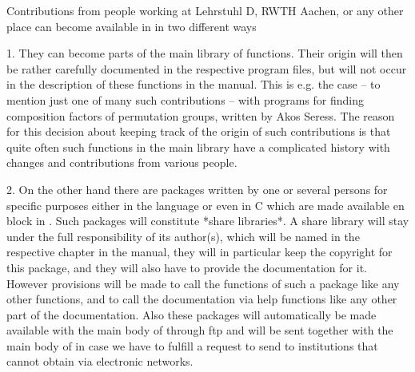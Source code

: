 \def\fuer{f{\accent127 u}r}
\def\GRAPE{\sf GRAPE}
\def\MeatAxe{\sf MeatAxe}
\def\SISYPHOS{\sc SISYPHOS}
\def\VE{Vector Enumeration}
\def\nauty{\it nauty}

Contributions from  people working at Lehrstuhl D,  RWTH  Aachen, or  any
other place can become available in {\GAP} in two different ways\:

1.  They can become parts of the main {\GAP} library of functions.  Their
origin will then be rather carefully documented in the respective program
files, but  will  not occur in the  description of these functions in the
manual.   This is  e.g.   the  case  -- to mention just one of many  such
contributions  --  with  programs  for  finding  composition  factors  of
permutation groups, written by Akos Seress. The reason for  this decision
about  keeping track  of the  origin of such  contributions is that quite
often such  functions  in  the  main  {\GAP} library  have a  complicated
history with changes and contributions from various people.

2.   On the other  hand  there are  packages  written  by one or  several
persons for specific purposes either in the {\GAP}  language or even in C
which  are  made  available en  block   in {\GAP}.   Such   packages will
constitute *share libraries*.  A  share library will  stay under the full
responsibility of  its author(s), which will  be  named in the respective
chapter in the manual,  they will in  particular  keep the  copyright for
this package, and they  will also have to  provide the documentation  for
it.  However  provisions  will be made  to call  the functions of  such a
package  like any other  {\GAP} functions, and  to call the documentation
via help functions like any other part of the {\GAP} documentation.  Also
these packages will automatically be made available with the main body of
{\GAP} through ftp and will be sent together with the main body of {\GAP}
in case we have to fulfill a request  to send {\GAP} to institutions that
cannot obtain {\GAP} via electronic networks.

